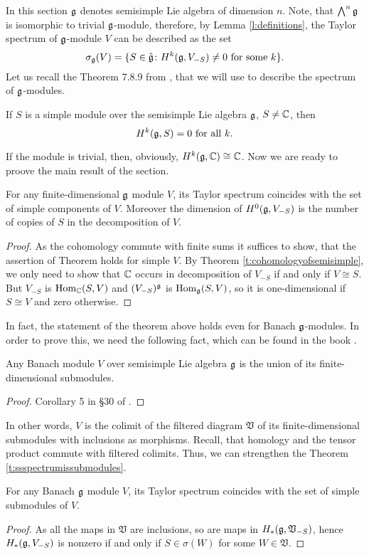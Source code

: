 In this section $\mathfrak{g}$ denotes semisimple Lie algebra of dimension $n$. Note, that $\bigwedge^n
\mathfrak{g}$ is isomorphic to trivial $\mathfrak{g}$-module, therefore, by Lemma \ref{l:definitions}, the Taylor
spectrum of $\mathfrak{g}$-module $V$ can be described as the set
\[
    \sigma_{\mathfrak{g}}(V) = \{ S \in \hat{\mathfrak{g}} \colon H^k(\mathfrak{g}, V_{-S})\neq 0 \text{ for some } k\}.
\]
Let us recall the Theorem 7.8.9 from \cite{weibel}, that we will use to describe the spectrum
of $\mathfrak{g}$-modules.
\begin{theorem} \label{t:cohomologyofsemisimple}
If $S$ is a simple module over the semisimple Lie algebra $\mathfrak{g}$, $S \neq \mathbb{C}$, then 
\[
    H^k(\mathfrak{g}, S) = 0 \text{ for all } k.
\]
\end{theorem}
If the module is trivial, then, obviously, $H^k(\mathfrak{g}, \mathbb{C}) \cong \mathbb{C}$. Now we are ready to proove
the main result of the section.
\begin{theorem} \label{t:ssspectrumissubmodules}
    For any finite-dimensional $\mathfrak{g}$ module $V$, its Taylor spectrum coincides with the set of
    simple components of $V$. Moreover the dimension of $H^0(\mathfrak{g}, V_{-S})$ is the number of copies
    of $S$ in the decomposition of $V$.
\end{theorem}
\begin{proof}
    As the cohomology commute with finite sums it suffices to show, that the assertion of Theorem holds for
    simple $V$. By Theorem \ref{t:cohomologyofsemisimple}, we only need to show that $\mathbb{C}$ occurs
    in decomposition of $V_{-S}$ if and only if $V\cong S$. But $V_{-S}$ is $\operatorname{Hom}_{\mathbb{C}}(S, V)$ and
    $(V_{-S})^{\mathfrak{g}}$ is $\operatorname{Hom}_{\mathfrak{g}}(S, V)$, so it is one-dimensional if $S\cong V$ and zero
    otherwise.
\end{proof}
In fact, the statement of the theorem above holds even for Banach $\mathfrak{g}$-modules. In order to
prove this, we need the following fact, which can be found in the book \cite{beltita}.

\begin{theorem}
    Any Banach module $V$ over semisimple Lie algebra $\mathfrak{g}$ is the union of its
    finite-dimensional submodules. 
\end{theorem}
\begin{proof}
    Corollary 5 in \S30 of \cite{beltita}.
\end{proof}
In other words, $V$ is the colimit of the filtered diagram $\mathfrak{V}$ of its finite-dimensional submodules
with inclusions as morphisms. Recall, that homology and the tensor product commute with filtered
colimits. Thus, we can strengthen the Theorem \ref{t:ssspectrumissubmodules}.
\begin{corollary}
    For any Banach $\mathfrak{g}$ module $V$, its Taylor spectrum coincides with the set of
    simple submodules of $V$. 
\end{corollary}
\begin{proof}
    As all the maps in $\mathfrak{V}$ are inclusions, so are maps in $H_*(\mathfrak{g}, \mathfrak{V}_{-S})$,
    hence $H_*(\mathfrak{g}, V_{-S})$ is nonzero if and only if $S \in \sigma(W)$ for some $W\in
    \mathfrak{V}$.
\end{proof}
